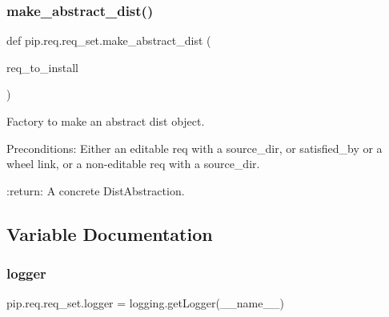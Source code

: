 \subsubsection{\texorpdfstring{make\+\_\+abstract\+\_\+dist()}{make\_abstract\_dist()}}
{\footnotesize\ttfamily def pip.\+req.\+req\+\_\+set.\+make\+\_\+abstract\+\_\+dist (\begin{DoxyParamCaption}\item[{}]{req\+\_\+to\+\_\+install }\end{DoxyParamCaption})}

\begin{DoxyVerb}Factory to make an abstract dist object.

Preconditions: Either an editable req with a source_dir, or satisfied_by or
a wheel link, or a non-editable req with a source_dir.

:return: A concrete DistAbstraction.
\end{DoxyVerb}
 

\subsection{Variable Documentation}
\mbox{\label{namespacepip_1_1req_1_1req__set_af90cb2c437dda0849fed3f9f246b6e2c}} 
\subsubsection{\texorpdfstring{logger}{logger}}
{\footnotesize\ttfamily pip.\+req.\+req\+\_\+set.\+logger = logging.\+get\+Logger(\+\_\+\+\_\+name\+\_\+\+\_\+)}

